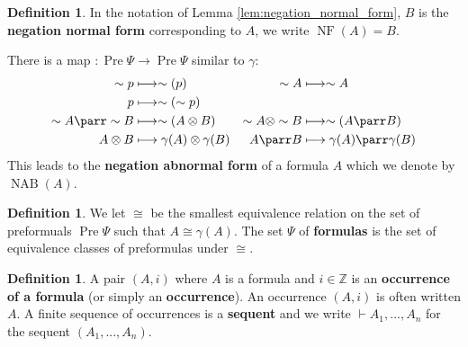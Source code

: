 \documentclass[12pt]{article}
\theoremstyle{plain}
\theoremstyle{definition}
\newtheorem{defn}[thm]{Definition} %
\newcommand{\bb}[1]{\mathbb{#1}}
\newcommand{\lto}{\longrightarrow}
\newcommand{\negation}{\sim}
\begin{document}
\begin{defn}
In the notation of Lemma \ref{lem:negation_normal_form}, $B$ is the \textbf{negation normal form} corresponding to $A$, we write $\operatorname{NF}(A) = B$.

There is a map $: \operatorname{Pre}\Psi \lto \operatorname{Pre}\Psi$ similar to $\gamma$:
\begin{align*}
    \negation p &\longmapsto \negation (p) & \negation A &\longmapsto \negation A\\
    p &\longmapsto \negation (\negation p) \\
    \negation A \parr \negation B&\longmapsto  \negation (A \otimes B) & \negation A \otimes \negation B &\longmapsto \negation (A \parr B) \\
    A \otimes B &\longmapsto \gamma(A) \otimes \gamma(B) & A \parr B &\longmapsto \gamma(A) \parr \gamma(B)
\end{align*}
This leads to the \textbf{negation abnormal form} of a formula $A$ which we denote by $\operatorname{NAB}(A)$.
\end{defn}
\begin{defn}
We let $\cong$ be the smallest equivalence relation on the set of preformuals $\operatorname{Pre}\Psi$ such that $A \cong \gamma(A)$. The set $\Psi$ of \textbf{formulas} is the set of equivalence classes of preformulas under $\cong$.
\end{defn}
\begin{defn}
A pair $(A,i)$ where $A$ is a formula and $i \in \bb{Z}$ is an \textbf{occurrence of a formula} (or simply an \textbf{occurrence}). An occurrence $(A,i)$ is often written $A$. A finite sequence of occurrences is a \textbf{sequent} and we write $\vdash A_1,...,A_n$ for the sequent $(A_1,...,A_n)$.
\end{defn}
\end{document}
